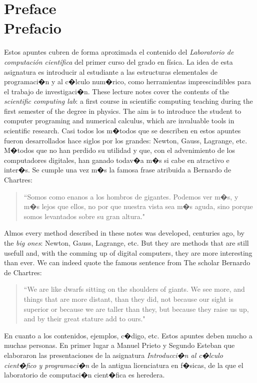 \chapter*{Preface\\ Prefacio}
\begin{paracol}{2}
Estos apuntes cubren de forma aproximada  el contenido del \emph{Laboratorio de computación científica} del primer curso del grado en física.
La idea de esta asignatura es  introducir al estudiante a las estructuras elementales de programaci�n y al c�lculo num�rico, como herramientas imprescindibles para el trabajo de investigaci�n.
\switchcolumn
These lecture notes cover the contents  of the \emph{scientific computing lab}: a first course in scientific computing teaching during the first semester of the degree in physics. The aim is to introduce the student to computer programing and numerical calculus, which are invaluable tools in scientific research.
\switchcolumn         
Casi todos los m�todos que se describen en estos apuntes fueron desarrollados hace siglos por los grandes: Newton, Gauss, Lagrange, etc.  M�todos que no han perdido su utilidad y que, con el advenimiento de los computadores digitales, han ganado todav�a m�s si cabe en atractivo e inter�s. Se cumple una vez m�s la famosa frase atribuida a Bernardo de Chartres:
\begin{quote}
``Somos como enanos a los hombros de gigantes. Podemos ver m�s, y m�s lejos que ellos, no por que nuestra vista sea m�s aguda, sino porque somos levantados sobre su gran altura."
\end{quote}
\switchcolumn
Almos every method described in these notes was developed, centuries ago, by the \emph{big ones}: Newton, Gauss, Lagrange, etc. But they are methods that are still usefull and, with the comming up of digital computers, they are more interesting than ever. We can indeed quote the famous sentence from The scholar Bernardo de Chartres:
\begin{quote}
``We are like dwarfs sitting on the shoulders of giants. We see more, and things that are more distant, than they did, not because our sight is superior or because we are taller than they, but because they raise us up, and by their great stature add to ours."
\end{quote}          

\switchcolumn
En cuanto a los contenidos, ejemplos, c�digo, etc. Estos apuntes deben mucho a muchas personas. En primer lugar a Manuel Prieto y Segundo Esteban que elaboraron las presentaciones de la asignatura \emph{Introducci�n al c�lculo cient�fico y programaci�n} de la antigua licenciatura en f�sicas, de la que el laboratorio de computaci�n cient�fica es heredera. 


\end{paracol}

